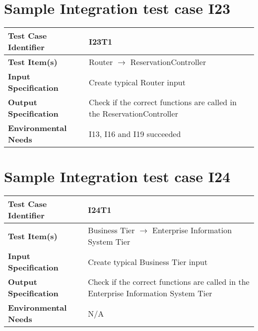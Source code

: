 \section{Sample Integration test case I23}\label{I23}
\begin{center}
	\vspace{0.6cm}
	\begin{tabular}{|l|l|}
		\hline
		\textbf{Test Case Identifier} & I23T1 \bigstrut \\\hline
		\textbf{Test Item(s)} & Router \ensuremath{\rightarrow} ReservationController \bigstrut \\\hline
		\textbf{Input Specification} & Create typical Router input \bigstrut \\\hline
		\textbf{Output Specification} & Check if the correct functions are called in the ReservationController \bigstrut \\\hline
		\textbf{Environmental Needs} & I13, I16 and I19 succeeded \bigstrut \\\hline
	\end{tabular}
\end{center}

\section{Sample Integration test case I24}\label{I24}
\begin{center}
	\vspace{0.6cm}
	\begin{tabular}{|l|l|}
		\hline
		\textbf{Test Case Identifier} & I24T1 \bigstrut \\\hline
		\textbf{Test Item(s)} & Business Tier \ensuremath{\rightarrow} Enterprise Information System Tier \bigstrut \\\hline
		\textbf{Input Specification} & Create typical Business Tier input \bigstrut \\\hline
		\textbf{Output Specification} & Check if the correct functions are called in the Enterprise Information System Tier \bigstrut \\\hline
		\textbf{Environmental Needs} & N/A \bigstrut \\\hline
	\end{tabular}
\end{center}

